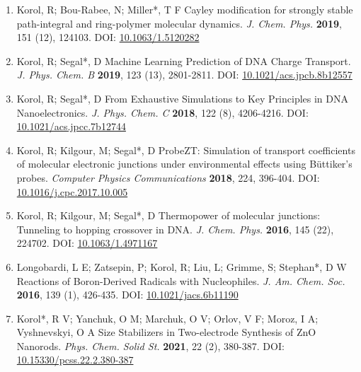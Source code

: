 \begin{enumerate}
\vspace{0.1cm}
\item[7.] Korol, R; Bou-Rabee, N; Miller*, T F Cayley modification for strongly stable path-integral and ring-polymer molecular dynamics. \textit{J. Chem. Phys.} \textbf{2019}, 151 (12), 124103. DOI: \href{https://doi.org/10.1063/1.5120282}{10.1063/1.5120282}
\vspace{0.1cm}
\item[6.] Korol, R; Segal*, D Machine Learning Prediction of DNA Charge Transport. \textit{J. Phys. Chem. B} \textbf{2019}, 123 (13), 2801-2811. DOI: \href{https://doi.org/10.1021/acs.jpcb.8b12557}{10.1021/acs.jpcb.8b12557}
\vspace{0.1cm}
\item[5.] Korol, R; Segal*, D From Exhaustive Simulations to Key Principles in DNA Nanoelectronics. \textit{J. Phys. Chem. C} \textbf{2018}, 122 (8), 4206-4216. DOI: \href{https://doi.org/10.1021/acs.jpcc.7b12744}{10.1021/acs.jpcc.7b12744}
\vspace{0.1cm}
\item[4.] Korol, R; Kilgour, M; Segal*, D ProbeZT: Simulation of transport coefficients of molecular electronic junctions under environmental effects using Büttiker's probes. \textit{Computer Physics Communications} \textbf{2018}, 224, 396-404. DOI: \href{https://doi.org/10.1016/j.cpc.2017.10.005}{10.1016/j.cpc.2017.10.005}
\vspace{0.1cm}
\item[3.] Korol, R; Kilgour, M; Segal*, D Thermopower of molecular junctions: Tunneling to hopping crossover in DNA. \textit{J. Chem. Phys.} \textbf{2016}, 145 (22), 224702. DOI: \href{https://doi.org/10.1063/1.4971167}{10.1063/1.4971167}
\vspace{0.1cm}
\item[2.] Longobardi, L E; Zatsepin, P; Korol, R; Liu, L; Grimme, S; Stephan*, D W Reactions of Boron-Derived Radicals with Nucleophiles. \textit{J. Am. Chem. Soc.} \textbf{2016}, 139 (1), 426-435. DOI: \href{https://doi.org/10.1021/jacs.6b11190}{10.1021/jacs.6b11190}
\vspace{0.1cm}
\item[1.] Korol*, R V; Yanchuk, O M; Marchuk, O V; Orlov, V F; Moroz, I A; Vyshnevskyi, O A Size Stabilizers in Two-electrode Synthesis of ZnO Nanorods. \textit{Phys. Chem. Solid St.} \textbf{2021}, 22 (2), 380-387. DOI: \href{https://doi.org/10.15330/pcss.22.2.380-387}{10.15330/pcss.22.2.380-387}
\vspace{0.1cm}
\end{enumerate}
